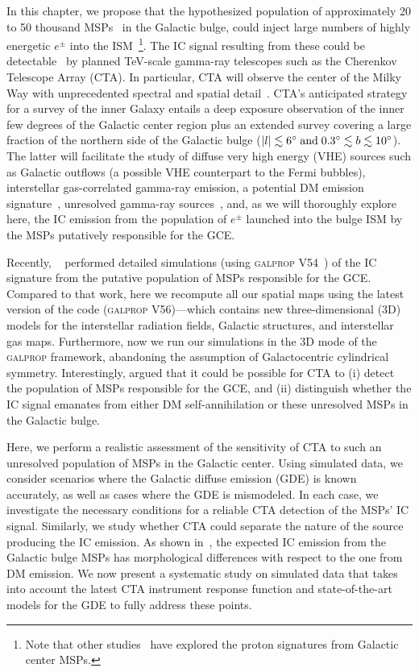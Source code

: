 \documentclass[doublespace,nopageskip]{VTthesis} %
\begin{document}
In this chapter, we propose that the hypothesized population of approximately 20 to 50 thousand MSPs~\citep{Ploeg:2020jeh} in the Galactic bulge, could inject large numbers of highly energetic $e^{\pm}$ into the ISM~\footnote{Note that other studies~\citep[e.g.,][]{Guepin:2018jkb} have explored the proton signatures from Galactic center MSPs.}. The  IC signal resulting from these could be detectable~\citep{Song:2019nrx} by planned TeV-scale gamma-ray telescopes such as 
the Cherenkov Telescope Array (CTA). 
%
In particular, CTA will observe the center of the Milky Way with unprecedented spectral and spatial detail~\citep{CTAConsortium:2018tzg}. 
%
CTA's anticipated strategy for a survey of the inner Galaxy entails a deep exposure observation of the inner few degrees of the Galactic center region plus an extended survey covering a large fraction of the northern side of the Galactic bulge ($|l|\lesssim 6^{\circ}\;{\rm and}\; 0.3^{\circ}\lesssim b \lesssim 10^{\circ}$). The latter will facilitate the study of diffuse very high energy (VHE) sources such as Galactic outflows (a possible VHE counterpart to the Fermi bubbles), interstellar gas-correlated gamma-ray emission, a potential DM emission signature~\citep{Acharyya:2020sbj}, unresolved gamma-ray sources~\citep{Viana:2019jwd}, and, as we will thoroughly explore here, the IC emission from the 
population of $e^\pm$ launched into the bulge ISM by the
 MSPs putatively responsible for the GCE.  



 Recently, ~\cite{Song:2019nrx} performed detailed simulations (using \textsc{galprop} V54~\citealt{Porter:2006tb}) of the IC signature from the putative population of MSPs responsible for the GCE. Compared to that work, here we recompute all our spatial maps using the latest version of the code (\textsc{galprop} V56)---which contains new three-dimensional (3D) models for the interstellar radiation fields, Galactic structures, and interstellar gas maps. Furthermore, now we run our simulations in the 3D mode of the \textsc{galprop} framework, abandoning the assumption of Galactocentric cylindrical symmetry. Interestingly, \cite{Song:2019nrx} argued that it could be possible for CTA to (i) detect the population of MSPs responsible for the GCE, and (ii) distinguish whether the IC signal emanates from either DM self-annihilation or these unresolved MSPs in the Galactic bulge. 
 
 Here, we perform a realistic assessment of the sensitivity of CTA to such an unresolved population of MSPs in the Galactic center. Using simulated data, we consider scenarios where the Galactic diffuse emission (GDE) is known accurately, as well as cases where the GDE is mismodeled. In each case, we investigate the necessary conditions for a reliable CTA detection of the MSPs' IC signal. Similarly, we study whether CTA could separate the nature of the source producing the IC emission. As shown in~\citet{Song:2019nrx}, the expected IC emission from the Galactic bulge MSPs has morphological differences with respect to the one from DM emission. We now present a systematic study on simulated data that takes into account the latest CTA instrument response function and state-of-the-art models for the GDE to fully address these points.
 
\end{document}

